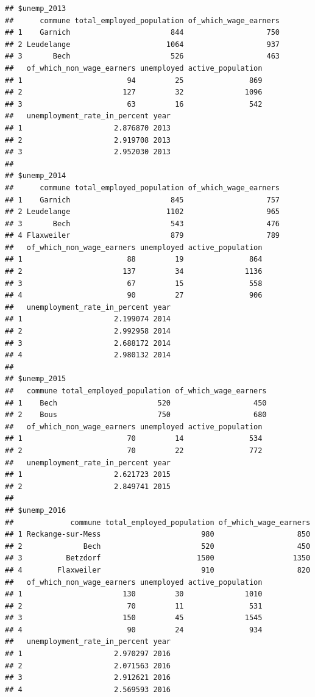 \documentclass[]{gitbook}
\begin{document}
\begin{verbatim}
## $unemp_2013
##      commune total_employed_population of_which_wage_earners
## 1    Garnich                       844                   750
## 2 Leudelange                      1064                   937
## 3       Bech                       526                   463
##   of_which_non_wage_earners unemployed active_population
## 1                        94         25               869
## 2                       127         32              1096
## 3                        63         16               542
##   unemployment_rate_in_percent year
## 1                     2.876870 2013
## 2                     2.919708 2013
## 3                     2.952030 2013
## 
## $unemp_2014
##      commune total_employed_population of_which_wage_earners
## 1    Garnich                       845                   757
## 2 Leudelange                      1102                   965
## 3       Bech                       543                   476
## 4 Flaxweiler                       879                   789
##   of_which_non_wage_earners unemployed active_population
## 1                        88         19               864
## 2                       137         34              1136
## 3                        67         15               558
## 4                        90         27               906
##   unemployment_rate_in_percent year
## 1                     2.199074 2014
## 2                     2.992958 2014
## 3                     2.688172 2014
## 4                     2.980132 2014
## 
## $unemp_2015
##   commune total_employed_population of_which_wage_earners
## 1    Bech                       520                   450
## 2    Bous                       750                   680
##   of_which_non_wage_earners unemployed active_population
## 1                        70         14               534
## 2                        70         22               772
##   unemployment_rate_in_percent year
## 1                     2.621723 2015
## 2                     2.849741 2015
## 
## $unemp_2016
##             commune total_employed_population of_which_wage_earners
## 1 Reckange-sur-Mess                       980                   850
## 2              Bech                       520                   450
## 3          Betzdorf                      1500                  1350
## 4        Flaxweiler                       910                   820
##   of_which_non_wage_earners unemployed active_population
## 1                       130         30              1010
## 2                        70         11               531
## 3                       150         45              1545
## 4                        90         24               934
##   unemployment_rate_in_percent year
## 1                     2.970297 2016
## 2                     2.071563 2016
## 3                     2.912621 2016
## 4                     2.569593 2016
\end{verbatim}
\end{document}
